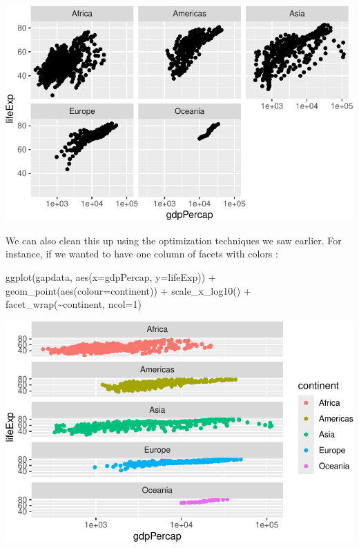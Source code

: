 \documentclass[
  letterpaper,
  DIV=11,
  numbers=noendperiod]{scrreprt}
\newenvironment{Shaded}{\begin{snugshade}}{\end{snugshade}}
\newcommand{\AttributeTok}[1]{\textcolor[rgb]{0.40,0.45,0.13}{#1}}
\newcommand{\DecValTok}[1]{\textcolor[rgb]{0.68,0.00,0.00}{#1}}
\newcommand{\FunctionTok}[1]{\textcolor[rgb]{0.28,0.35,0.67}{#1}}
\newcommand{\NormalTok}[1]{\textcolor[rgb]{0.00,0.23,0.31}{#1}}
\newcommand{\SpecialCharTok}[1]{\textcolor[rgb]{0.37,0.37,0.37}{#1}}
\begin{document}
\includegraphics{Advanced_Scatterplot_Techniques_files/figure-pdf/unnamed-chunk-17-1.pdf}

We can also clean this up using the optimization techniques we saw
earlier. For instance, if we wanted to have one column of facets with
colors :

\begin{Shaded}
\begin{Highlighting}[]
\FunctionTok{ggplot}\NormalTok{(gapdata, }\FunctionTok{aes}\NormalTok{(}\AttributeTok{x=}\NormalTok{gdpPercap, }\AttributeTok{y=}\NormalTok{lifeExp)) }\SpecialCharTok{+}
  \FunctionTok{geom\_point}\NormalTok{(}\FunctionTok{aes}\NormalTok{(}\AttributeTok{colour=}\NormalTok{continent)) }\SpecialCharTok{+}
  \FunctionTok{scale\_x\_log10}\NormalTok{() }\SpecialCharTok{+}
  \FunctionTok{facet\_wrap}\NormalTok{(}\SpecialCharTok{\textasciitilde{}}\NormalTok{continent, }\AttributeTok{ncol=}\DecValTok{1}\NormalTok{) }
\end{Highlighting}
\end{Shaded}

\includegraphics{Advanced_Scatterplot_Techniques_files/figure-pdf/unnamed-chunk-18-1.pdf}
\end{document}
